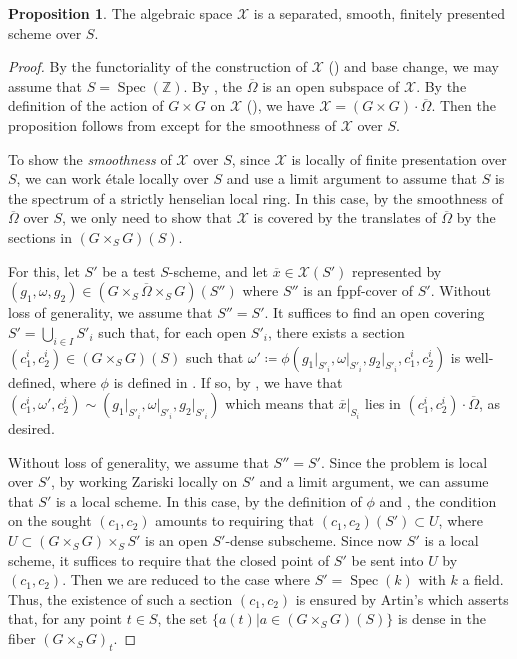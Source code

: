 \documentclass[11pt, reqno]{amsart}
\theoremstyle{plain}
\theoremstyle{definition}
\newtheorem{proposition}[theorem]{Proposition}
\DeclareMathOperator{\Spec}{Spec}		%
\begin{document}
\begin{proposition}\label{schematicnature}
    The algebraic space $\mathcal{X}$ is a separated, smooth, finitely presented scheme over $S$.
\end{proposition}

\begin{proof}
    By the functoriality of the construction of $\mathcal{X}$ () and base change, we may assume that $S=\Spec(\mathbb{Z})$.
    By , the $\overline{\Omega}$ is an open subspace of $\mathcal{X}$. By the definition of the action of $G\times G$ on $\mathcal{X}$ (), we have $\mathcal{X}=(G\times G)\cdot\overline{\Omega} $. Then the proposition follows from \cite[Section~6.6, Theorem~2 (a) and (b)]{BLR} except for the smoothness of $\mathcal{X}$ over $S$. 
    
    To show the \emph{smoothness} of $\mathcal{X}$ over $S$, since $\mathcal{X}$ is locally of finite presentation over $S$, we can work étale locally over $S$ and use a limit argument to assume that $S$ is the spectrum of a strictly henselian local ring.
    In this case, by the smoothness of $\overline{\Omega}$ over $S$, we only need to show that $\mathcal{X}$ is covered by the translates of $\overline{\Omega}$ by the sections in $(G\times_S G)(S)$. 
    
    For this, let $S'$ be a test $S$-scheme, and let $\overline{x}\in \mathcal{X}(S')$ represented by $(g_1,\omega,g_2)\in (G\times_{S} \overline{\Omega}\times_S G)(S'')$ where $S''$ is an fppf-cover of $S'$. Without loss of generality, we assume that $S''=S'$. It suffices to find an open covering $S'=\bigcup_{i\in I} S'_{i}$ such that, for each open $S'_i$, there exists a section $(c_1^i,c_2^i)\in(G\times_S G)(S)$ such that $\omega'\coloneq \phi(g_1\vert_{S'_{i}},\omega\vert_{S'_{i}},g_2\vert_{S'_{i}},c_1^i,c_2^i)$ is well-defined, where $\phi$ is defined in . If so, by , we have that $(c_1^i,\omega',c_2^i)\sim (g_1\vert_{S'_{i}},\omega\vert_{S'_{i}},g_2\vert_{S'_{i}})$ which means that $\overline{x}\vert_{S_i}$ lies in $(c_1^i,c_2^i)\cdot \overline{\Omega}$, as desired. 

    Without loss of generality, we assume that $S''=S'$. Since the problem is local over $S'$, by working Zariski locally on $S'$ and a limit argument, we can assume that $S'$ is a local scheme. In this case, by the definition of $\phi$ and , the condition on the sought $(c_1,c_2)$ amounts to requiring that $(c_1,c_2)(S')\subset U$, where $U\subset (G\times_S G)\times_{S} S'$ is an open $S'$-dense subscheme. Since now $S'$ is a local scheme, it suffices to require that the closed point of $S'$ be sent into $U$ by $(c_1,c_2)$. Then we are reduced to the case where $S'=\Spec(k)$ with $k$ a field. Thus, the existence of such a section $(c_1,c_2)$ is ensured by Artin's \cite[\S~5.3, Lemma~7]{BLR} which asserts that, for any point $t\in S$, the set $\{a(t)\vert a\in (G\times_S G)(S)\}$ is dense in the fiber $(G\times_S G)_t$.
\end{proof}
\end{document}
